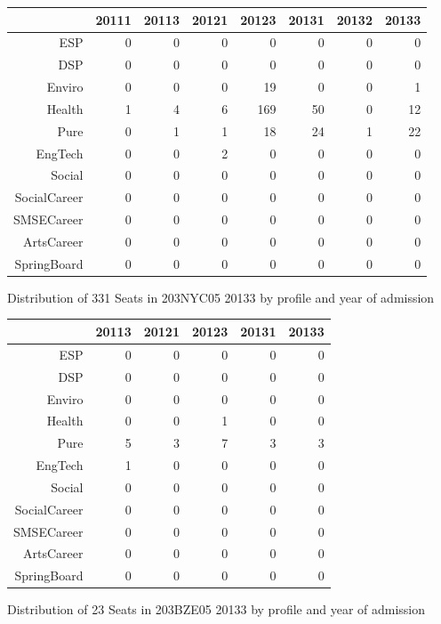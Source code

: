 \documentclass{article}\usepackage[]{graphicx}\usepackage[]{color}
\makeatletter
\newenvironment{kframe}{%
 \def\at@end@of@kframe{}%
 \ifinner\ifhmode%
  \def\at@end@of@kframe{\end{minipage}}%
  \begin{minipage}{\columnwidth}%
 \fi\fi%
 \def\FrameCommand##1{\hskip\@totalleftmargin \hskip-\fboxsep
 \colorbox{shadecolor}{##1}\hskip-\fboxsep
     \hskip-\linewidth \hskip-\@totalleftmargin \hskip\columnwidth}%
 \MakeFramed {\advance\hsize-\width
   \@totalleftmargin\z@ \linewidth\hsize
   \@setminipage}}%
 {\par\unskip\endMakeFramed%
 \at@end@of@kframe}
\makeatother
\begin{document}
\begin{figure}[H]
\centering
\begin{tabular}{rrrrrrrr}
  \hline
 & 20111 & 20113 & 20121 & 20123 & 20131 & 20132 & 20133 \\ 
  \hline
ESP &   0 &   0 &   0 &   0 &   0 &   0 &   0 \\ 
  DSP &   0 &   0 &   0 &   0 &   0 &   0 &   0 \\ 
  Enviro &   0 &   0 &   0 &  19 &   0 &   0 &   1 \\ 
  Health &   1 &   4 &   6 & 169 &  50 &   0 &  12 \\ 
  Pure &   0 &   1 &   1 &  18 &  24 &   1 &  22 \\ 
  EngTech &   0 &   0 &   2 &   0 &   0 &   0 &   0 \\ 
  Social &   0 &   0 &   0 &   0 &   0 &   0 &   0 \\ 
  SocialCareer &   0 &   0 &   0 &   0 &   0 &   0 &   0 \\ 
  SMSECareer &   0 &   0 &   0 &   0 &   0 &   0 &   0 \\ 
  ArtsCareer &   0 &   0 &   0 &   0 &   0 &   0 &   0 \\ 
  SpringBoard &   0 &   0 &   0 &   0 &   0 &   0 &   0 \\ 
   \hline
\end{tabular}
\caption{Distribution of 331 Seats in 203NYC05 20133 by profile and year of admission} 
\end{figure}
\begin{kframe}

{\ttfamily\noindent\bfseries\color{errorcolor}{\#\# Error in characters | factors: operations are possible only for numeric, logical or complex types}}\end{kframe}%
\begin{figure}[H]
\centering
\begin{tabular}{rrrrrr}
  \hline
 & 20113 & 20121 & 20123 & 20131 & 20133 \\ 
  \hline
ESP &   0 &   0 &   0 &   0 &   0 \\ 
  DSP &   0 &   0 &   0 &   0 &   0 \\ 
  Enviro &   0 &   0 &   0 &   0 &   0 \\ 
  Health &   0 &   0 &   1 &   0 &   0 \\ 
  Pure &   5 &   3 &   7 &   3 &   3 \\ 
  EngTech &   1 &   0 &   0 &   0 &   0 \\ 
  Social &   0 &   0 &   0 &   0 &   0 \\ 
  SocialCareer &   0 &   0 &   0 &   0 &   0 \\ 
  SMSECareer &   0 &   0 &   0 &   0 &   0 \\ 
  ArtsCareer &   0 &   0 &   0 &   0 &   0 \\ 
  SpringBoard &   0 &   0 &   0 &   0 &   0 \\ 
   \hline
\end{tabular}
\caption{Distribution of 23 Seats in 203BZE05 20133 by profile and year of admission} 
\end{figure}
\end{document}
